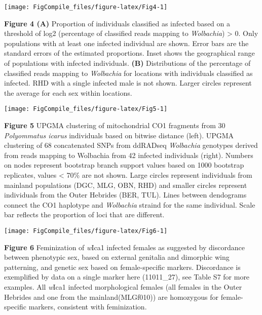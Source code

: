 \documentclass[12pt,]{article}
\begin{document}
\begin{center}\texttt{[image: FigCompile\_files/figure-latex/Fig4-1]} \end{center}

\textbf{Figure 4 (A)} Proportion of individuals classified as infected
based on a threshold of log2 (percentage of classified reads mapping to
\emph{Wolbachia}) \textgreater{} 0. Only populations with at least one
infected individual are shown. Error bars are the standard errors of the
estimated proportions. Inset shows the geographical range of populations
with infected individuals. \textbf{(B)} Distributions of the percentage
of classified reads mapping to \emph{Wolbachia} for locations with
individuals classified as infected. RHD with a single infected male is
not shown. Larger circles represent the average for each sex within
locations.

\pagebreak

\begin{center}\texttt{[image: FigCompile\_files/figure-latex/Fig5-1]} \end{center}

\textbf{Figure 5} UPGMA clustering of mitochondrial CO1 fragments from
30 \emph{Polyommatus icarus} individuals based on bitwise distance
(left). UPGMA clustering of 68 concatenated SNPs from ddRADseq
\emph{Wolbachia} genotypes derived from reads mapping to Wolbachia from
42 infected individuals (right). Numbers on nodes represent bootstrap
branch support values based on 1000 bootstrap replicates, values
\textless{} 70\% are not shown. Large circles represent individuals from
mainland populations (DGC, MLG, OBN, RHD) and smaller circles represent
individuals from the Outer Hebrides (BER, TUL). Lines between dendograms
connect the CO1 haplotype and \emph{Wolbachia} straind for the same
individual. Scale bar reflects the proportion of loci that are
different.

\pagebreak

\begin{center}\texttt{[image: FigCompile\_files/figure-latex/Fig6-1]} \end{center}

\textbf{Figure 6} Feminization of \emph{w}Ica1 infected females as
suggested by discordance between phenotypic sex, based on external
genitalia and dimorphic wing patterning, and genetic sex based on
female-specific markers. Discordance is exemplified by data on a single
marker here (11011\_27), see Table S7 for more examples. All
\emph{w}Ica1 infected morphological females (all females in the Outer
Hebrides and one from the mainland(MLGf010)) are homozygous for
female-specific markers, consistent with feminization.
\end{document}
